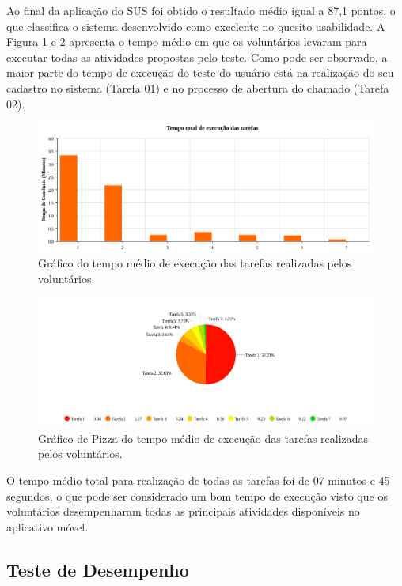 Ao final da aplicação do SUS foi obtido o resultado médio igual a 87,1 pontos, o que classifica o sistema desenvolvido como excelente no quesito usabilidade. A Figura \ref{time_task} e \ref{time_pizza} apresenta o tempo médio em que os voluntários levaram para executar todas as atividades propostas pelo teste. Como pode ser observado, a maior parte do tempo de execução do teste do usuário está na realização do seu cadastro no sistema (Tarefa 01) e no processo de abertura do chamado (Tarefa 02).

\begin{figure}[H]
  \centering
  \includegraphics[width=1\textwidth]{figuras/time_task.png} 
  \caption{Gráfico do tempo médio de execução das tarefas realizadas pelos voluntários.}
  \label{time_task} 
\end{figure}

\begin{figure}[H]
  \centering
  \includegraphics[width=1\textwidth]{figuras/time_pizza.png} 
  \caption{Gráfico de Pizza do tempo médio de execução das tarefas realizadas pelos voluntários.}
  \label{time_pizza} 
\end{figure}

O tempo médio total para realização de todas as tarefas foi de 07 minutos e 45 segundos, o que pode ser considerado um bom tempo de execução visto que os voluntários desempenharam todas as principais atividades disponíveis no aplicativo móvel.

\subsection*{Teste de Desempenho}

